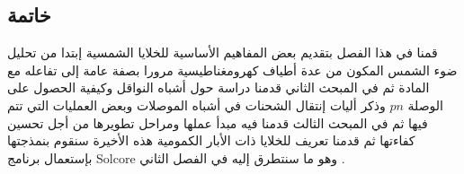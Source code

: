 	\subsection{ خاتمة }
	قمنا في هذا الفصل بتقديم بعض المفاهيم الأساسية للخلايا الشمسية إبتدا من تحليل ضوء الشمس المكون من عدة أطياف كهرومغناطيسية مرورا بصفة عامة إلى تفاعله مع المادة ثم في المبحث الثاني قدمنا دراسة  حول أشباه النواقل وكيفية الحصول على الوصلة $ pn $ وذكر أليات إنتقال الشحنات في أشباه الموصلات وبعض العمليات التي تتم فيها  ثم في المبحث الثالث قدمنا فيه  مبدأ عملها ومراحل تطويرها من أجل تحسين كفاءتها ثم قدمنا تعريف  للخلايا ذات الأبار الكمومية هذه الأخيرة سنقوم بنمذجتها بإستعمال برنامج Solcore وهو ما سنتطرق إليه في الفصل الثاني .
	